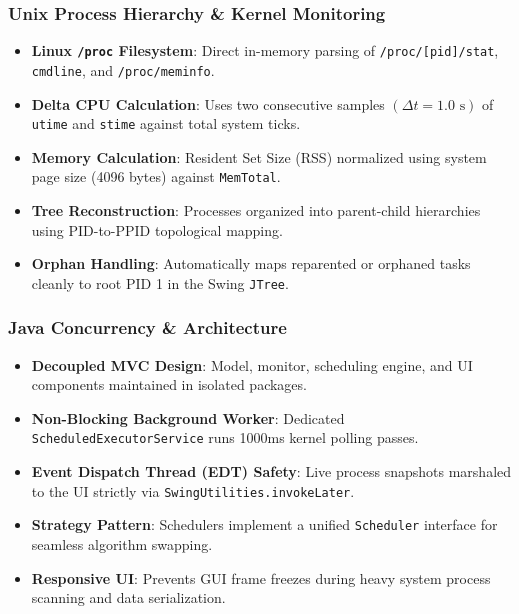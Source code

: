 \documentclass[aspectratio=169,10pt]{beamer}
\begin{document}
\begin{frame}
  \frametitle{Unix Process Hierarchy \& Kernel Monitoring}
  \begin{itemize}
    \item \textbf{Linux \texttt{/proc} Filesystem}: Direct in-memory parsing of \texttt{/proc/[pid]/stat}, \texttt{cmdline}, and \texttt{/proc/meminfo}.
    \item \textbf{Delta CPU Calculation}: Uses two consecutive samples $(\Delta t = 1.0\text{ s})$ of \texttt{utime} and \texttt{stime} against total system ticks.
    \item \textbf{Memory Calculation}: Resident Set Size (RSS) normalized using system page size (4096 bytes) against \texttt{MemTotal}.
    \item \textbf{Tree Reconstruction}: Processes organized into parent-child hierarchies using PID-to-PPID topological mapping.
    \item \textbf{Orphan Handling}: Automatically maps reparented or orphaned tasks cleanly to root PID 1 in the Swing \texttt{JTree}.
  \end{itemize}
\end{frame}

\begin{frame}
  \frametitle{Java Concurrency \& Architecture}
  \begin{itemize}
    \item \textbf{Decoupled MVC Design}: Model, monitor, scheduling engine, and UI components maintained in isolated packages.
    \item \textbf{Non-Blocking Background Worker}: Dedicated \texttt{ScheduledExecutorService} runs 1000ms kernel polling passes.
    \item \textbf{Event Dispatch Thread (EDT) Safety}: Live process snapshots marshaled to the UI strictly via \texttt{SwingUtilities.invokeLater}.
    \item \textbf{Strategy Pattern}: Schedulers implement a unified \texttt{Scheduler} interface for seamless algorithm swapping.
    \item \textbf{Responsive UI}: Prevents GUI frame freezes during heavy system process scanning and data serialization.
  \end{itemize}
\end{frame}
\end{document}
